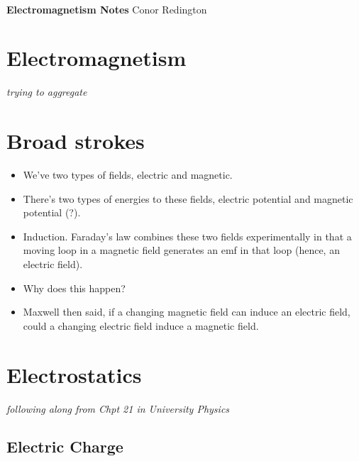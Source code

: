 \documentclass[11pt]{article}
\begin{document}
\thispagestyle{empty}
\bigskip \
\vspace{0.1cm}

\begin{center}
{\fontsize{36}{36} \selectfont \bf \sffamily Electromagnetism Notes}
\vskip 24pt
{\fontsize{18}{18} \selectfont \rmfamily Conor Redington} 
\vskip 24pt
\end{center}

\newpage
\microtoc
\newpage

\hypertarget{electromagnetism}{%
\section{Electromagnetism}\label{electromagnetism}}

\emph{trying to aggregate}

\hypertarget{broad-strokes}{%
\section{Broad strokes}\label{broad-strokes}}

\begin{itemize}
\tightlist
\item
  We've two types of fields, electric and magnetic.
\item
  There's two types of energies to these fields, electric potential and
  magnetic potential (?).
\item
  Induction. Faraday's law combines these two fields experimentally in
  that a moving loop in a magnetic field generates an emf in that loop
  (hence, an electric field).
\item
  Why does this happen?
\item
  Maxwell then said, if a changing magnetic field can induce an electric
  field, could a changing electric field induce a magnetic field.
\end{itemize}

\hypertarget{electrostatics}{%
\section{Electrostatics}\label{electrostatics}}

\emph{following along from Chpt 21 in University Physics}

\hypertarget{electric-charge}{%
\subsection{Electric Charge}\label{electric-charge}}
\end{document}
